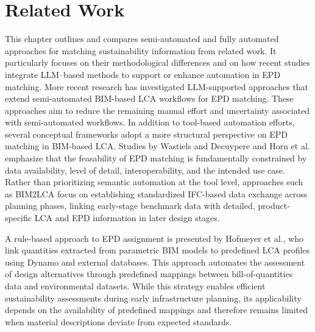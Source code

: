 \documentclass[10pt, a4paper, twocolumn]{article}
\begin{document}
\section{Related Work}

This chapter outlines and compares semi-automated and fully automated approaches for matching sustainability information from related work. It particularly focuses on their methodological differences and on how recent studies integrate LLM–based methods to support or enhance automation in EPD matching. 
More recent research has investigated LLM-supported approaches that extend semi-automated BIM-based LCA workflows for EPD matching. These approaches aim to reduce the remaining manual effort and uncertainty associated with semi-automated workflows.  
In addition to tool-based automation efforts, several conceptual frameworks adopt a more structural perspective on EPD matching in BIM-based LCA. Studies by Wastiels and Decuypere and Horn et al. emphasize that the feasability of EPD matching is fundamentally constrained by data availability, level of detail, interoperability, and the intended use case. Rather than prioritizing semantic automation at the tool level, approaches such as BIM2LCA focus on establishing standardized IFC-based data exchange across planning phases, linking early-stage benchmark data with detailed, product-specific LCA and EPD information in later design stages. ~\cite{Wastiels.2019, Horn.2020} 

A rule-based approach to EPD assignment is presented by Hofmeyer et al., who link quantities extracted from parametric BIM models to predefined LCA profiles using Dynamo and external databases. This approach automates the assessment of design alternatives through predefined mappings between bill-of-quantities data and environmental datasets. While this strategy enables efficient sustainability assessments during early infrastructure planning, its applicability depends on the availability of predefined mappings and therefore remains limited when material descriptions deviate from expected standards. ~\cite{J.HofmeyerK.ForthS.EsserA.Borrmann.}
\end{document}
